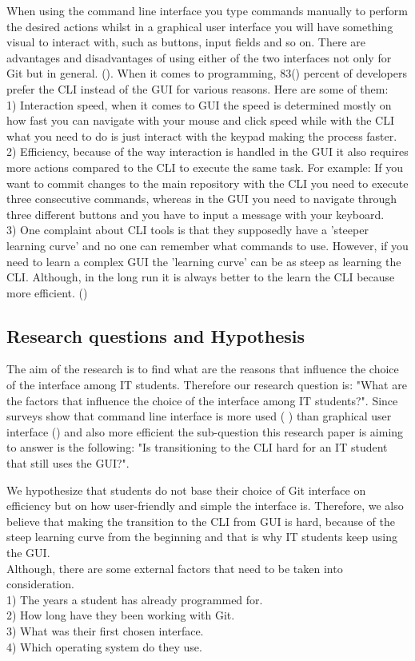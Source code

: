 \documentclass[]{report}
\begin{document}
	When using the command line interface you type commands manually to perform the desired actions whilst in a graphical user interface you will have something visual to interact with, such as buttons, input fields and so on. There are advantages and disadvantages of using either of the two interfaces not only for Git but in general. (\cite{hultstrand_git_2015}). When it comes to programming, 83(\cite{stackoverflow_stack_nodate}) percent of developers prefer the CLI instead of the GUI for various  reasons. Here are some of them: \\1) Interaction speed, when it comes to GUI the speed is determined mostly on how fast you can navigate with your mouse and click speed while with the CLI what you need to do is just interact with the keypad making the process faster. \\2) Efficiency, because of the way interaction is handled in the GUI it also requires more actions compared to the CLI to execute the same task. For example: If you want to commit changes to the main repository with the CLI you need to execute three consecutive commands, whereas in the GUI you need to navigate through three different buttons and you have to input a message with your keyboard. \\3) One complaint about CLI tools is that they supposedly have a 'steeper learning curve' and no one can remember what commands to use. However, if you need to learn a complex GUI the 'learning curve' can be as steep as learning the CLI. Although, in the long run it is always better to the learn the CLI because more efficient. (\cite{justin_c_bagley_reasons_nodate})

	\subsection{Research questions and Hypothesis}
	The aim of the research is to find what are the reasons that influence the choice of the interface among IT students. Therefore our research question is: "What are the factors that influence the choice of the interface among IT students?". Since surveys show that command line interface is more used (\cite{stackoverflow_stack_nodate} ) than graphical user interface (\cite{justin_c_bagley_reasons_nodate}) and also more efficient the sub-question this research paper is aiming to answer is the following: "Is transitioning to the CLI hard for an IT student that still uses the GUI?".
	
	We hypothesize that students do not base their choice of Git interface on efficiency but on how user-friendly and simple the interface is. Therefore, we also believe that making the transition to the CLI from GUI is hard, because of the steep learning curve from the beginning and that is why IT students keep using the GUI.\\
	Although, there are some external factors that need to be taken into consideration. \\1) The years a student has already programmed for.\\2) How long have they been working with Git. \\3) What was their first chosen interface.\\4) Which operating system do they use. 
	
\end{document}
